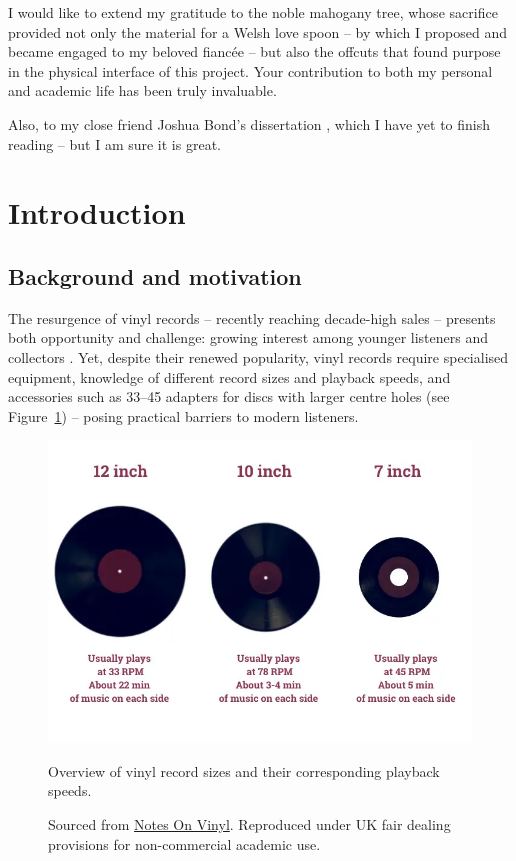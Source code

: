     
    
    \begin{uomacknowledgements}
    I would like to extend my gratitude to the noble mahogany tree, whose sacrifice provided not only the material for a Welsh love spoon -- by which I proposed and became engaged to my beloved fiancée -- but also the offcuts that found purpose in the physical interface of this project. Your contribution to both my personal and academic life has been truly invaluable.
    
    Also, to my close friend Joshua Bond's dissertation \cite{jdbond}, which I have yet to finish reading -- but I am sure it is great.
    \end{uomacknowledgements}
    
    
    \section{Introduction}
    
        \subsection{Background and motivation}
    
            The resurgence of vinyl records -- recently reaching decade-high sales \cite{geraghty2023uk_vinyl_sales} -- presents both opportunity and challenge: growing interest among younger listeners and collectors \cite{Trapp2023}. Yet, despite their renewed popularity, vinyl records require specialised equipment, knowledge of different record sizes and playback speeds, and accessories such as 33–45 adapters for discs with larger centre holes (see Figure~\ref{fig:vinylSizes}) -- posing practical barriers to modern listeners.
    
            \begin{figure}[htbp]
                \centering
                \includegraphics[width=0.8\linewidth]{images/33vs45.jpg}
                \caption{Overview of vinyl record sizes and their corresponding playback speeds.}
                \caption*{Sourced from \href{https://notesonvinyl.com/the-difference-between-33-vs-45-vinyl/}{Notes On Vinyl}. Reproduced under UK fair dealing provisions for non-commercial academic use.}
                \label{fig:vinylSizes}
            \end{figure}
    
